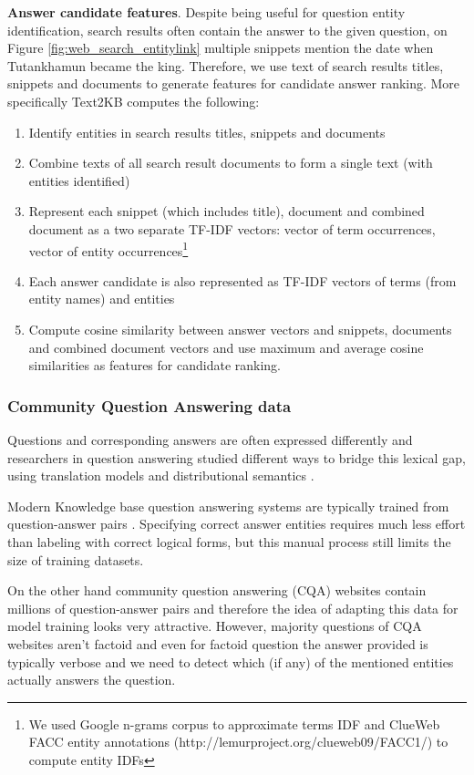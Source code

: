 \textbf{Answer candidate features}.
Despite being useful for question entity identification, search results often contain the answer to the given question, \eg on Figure \ref{fig:web_search_entitylink} multiple snippets mention the date when Tutankhamun became the king.
Therefore, we use text of search results titles, snippets and documents to generate features for candidate answer ranking.
More specifically Text2KB computes the following:
\begin{enumerate}
\item Identify entities in search results titles, snippets and documents
\item Combine texts of all search result documents to form a single text (with entities identified)
\item Represent each snippet (which includes title), document and combined document as a two separate TF-IDF vectors: vector of term occurrences, vector of entity occurrences\footnote{We used Google n-grams corpus to approximate terms IDF and ClueWeb FACC entity annotations (http://lemurproject.org/clueweb09/FACC1/) to compute entity IDFs}
\item Each answer candidate is also represented as TF-IDF vectors of terms (from entity names) and entities
\item Compute cosine similarity between answer vectors and snippets, documents and combined document vectors and use maximum and average cosine similarities as features for candidate ranking.
\end{enumerate}

\subsubsection{Community Question Answering data}

Questions and corresponding answers are often expressed differently and researchers in question answering studied different ways to bridge this lexical gap, \eg using translation models \cite{Murdock:2005:TMS:1220575.1220661} and distributional semantics \cite{yu2014deep}.

Modern Knowledge base question answering systems are typically trained from question-answer pairs \cite{Berant:EMNLP13}.
Specifying correct answer entities requires much less effort than labeling with correct logical forms, but this manual process still limits the size of training datasets.

On the other hand community question answering (CQA) websites contain millions of question-answer pairs and therefore the idea of adapting this data for model training looks very attractive.
However, majority questions of CQA websites aren't factoid and even for factoid question the answer provided is typically verbose and we need to detect which (if any) of the mentioned entities actually answers the question.



